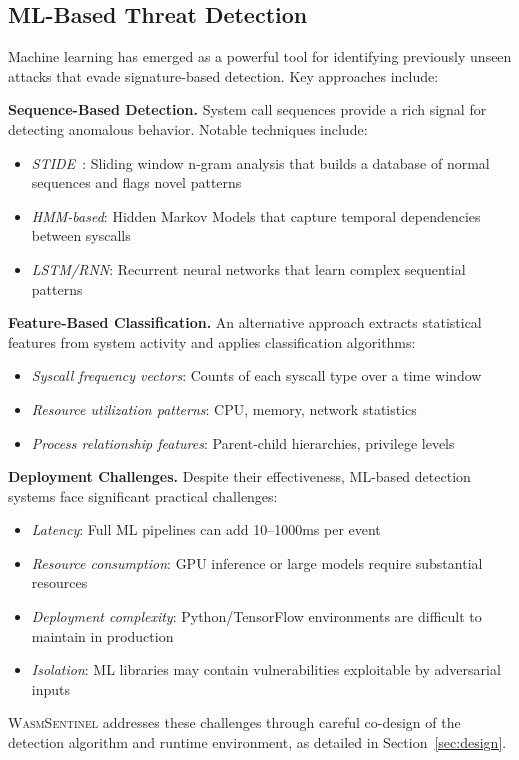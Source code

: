 \subsection{ML-Based Threat Detection}
\label{sec:bg-ml}

Machine learning has emerged as a powerful tool for identifying previously unseen attacks that evade signature-based detection.
Key approaches include:

\textbf{Sequence-Based Detection.}
System call sequences provide a rich signal for detecting anomalous behavior.
Notable techniques include:
\begin{itemize}
    \item \textit{STIDE}~\cite{stide}: Sliding window n-gram analysis that builds a database of normal sequences and flags novel patterns
    \item \textit{HMM-based}: Hidden Markov Models that capture temporal dependencies between syscalls
    \item \textit{LSTM/RNN}: Recurrent neural networks that learn complex sequential patterns
\end{itemize}

\textbf{Feature-Based Classification.}
An alternative approach extracts statistical features from system activity and applies classification algorithms:
\begin{itemize}
    \item \textit{Syscall frequency vectors}: Counts of each syscall type over a time window
    \item \textit{Resource utilization patterns}: CPU, memory, network statistics
    \item \textit{Process relationship features}: Parent-child hierarchies, privilege levels
\end{itemize}

\textbf{Deployment Challenges.}
Despite their effectiveness, ML-based detection systems face significant practical challenges:
\begin{itemize}
    \item \textit{Latency}: Full ML pipelines can add 10--1000ms per event
    \item \textit{Resource consumption}: GPU inference or large models require substantial resources
    \item \textit{Deployment complexity}: Python/TensorFlow environments are difficult to maintain in production
    \item \textit{Isolation}: ML libraries may contain vulnerabilities exploitable by adversarial inputs
\end{itemize}

\textsc{WasmSentinel} addresses these challenges through careful co-design of the detection algorithm and runtime environment, as detailed in Section~\ref{sec:design}.
